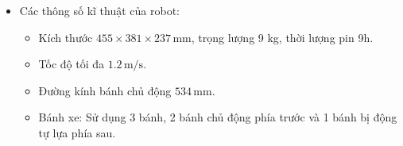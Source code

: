 \begin{itemize}
            \item Các thông số kĩ thuật của robot:
                \begin{itemize}[label=\textendash]
                    \item Kích thước $455 \times 381 \times 237 \,\mathrm{mm}$, trọng lượng 9 kg, thời lượng pin 9h.
                    \item Tốc độ tối đa $1.2 \,\mathrm{m/s}$.
                    \item Đường kính bánh chủ động $534 \,\mathrm{mm}$.
                    \item Bánh xe: Sử dụng 3 bánh, 2 bánh chủ động phía trước và 1 bánh bị động tự lựa phía sau.
                \end{itemize}
        \end{itemize}



